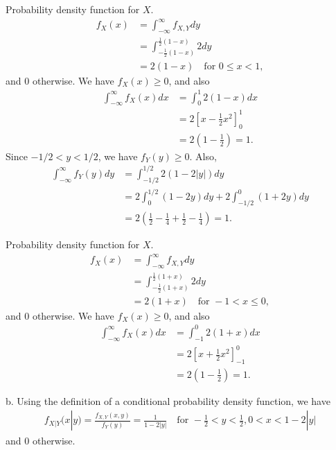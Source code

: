 \begin{exercise}
\begin{solution}
Probability density function for $X$.
            \begin{align*}
                f_{X}(x) & = \int_{-\infty}^{\infty}f_{X,Y}dy\\
                & = \int_{-\frac{1}{2}(1-x)}^{\frac{1}{2}(1-x)}2dy\\
                & = 2(1-x)\quad\text{for } 0\leq x< 1,
            \end{align*}
            and 0 otherwise.
            We have $f_{X}(x)\geq 0$, and also
            \begin{align*}
                \int_{-\infty}^{\infty}f_{X}(x)dx &= \int_{0}^{1}2(1-x)dx\\
                &=2\left[x-\frac{1}{2}x^2\right]_{0}^{1}\\
                & = 2\left(1-\frac{1}{2}\right) = 1.
            \end{align*}
            Since $-1/2< y< 1/2$, we have $f_{Y}(y)\geq 0$. Also,
            \begin{align*}
                \int_{-\infty}^{\infty}f_{Y}(y)dy &= \int_{-1/2}^{1/2}2(1-2|y|)dy\\
                &=2\int_{0}^{1/2}(1-2y)dy + 2\int_{-1/2}^{0}(1+2y)dy\\
                &=2\left(\frac{1}{2}-\frac{1}{4} +\frac{1}{2}-\frac{1}{4}\right) = 1.
            \end{align*}

Probability density function for $X$.
            \begin{align*}
                f_{X}(x) & = \int_{-\infty}^{\infty}f_{X,Y}dy\\
                & = \int_{-\frac{1}{2}(1+x)}^{\frac{1}{2}(1+x)}2dy\\
                & = 2(1+x)\quad\text{for } -1< x\leq 0,
            \end{align*}
            and 0 otherwise.
            We have $f_{X}(x)\geq 0$, and also
            \begin{align*}
                \int_{-\infty}^{\infty}f_{X}(x)dx &= \int_{-1}^{0}2(1+x)dx\\
                &=2\left[x+\frac{1}{2}x^2\right]_{-1}^{0}\\
                & = 2\left(1-\frac{1}{2}\right) = 1.
            \end{align*}

b.
            Using the definition of a conditional probability density function, we have
            \begin{align*}
                f_{X|Y}(x|y) = \frac{f_{X,Y}(x,y)}{f_{Y}(y)}=\frac{1}{1-2|y|}\quad\text{for }-\frac{1}{2}<y<\frac{1}{2}, 0<x<1-2|y|
            \end{align*}
            and $0$ otherwise.



\end{solution}
\end{exercise}
